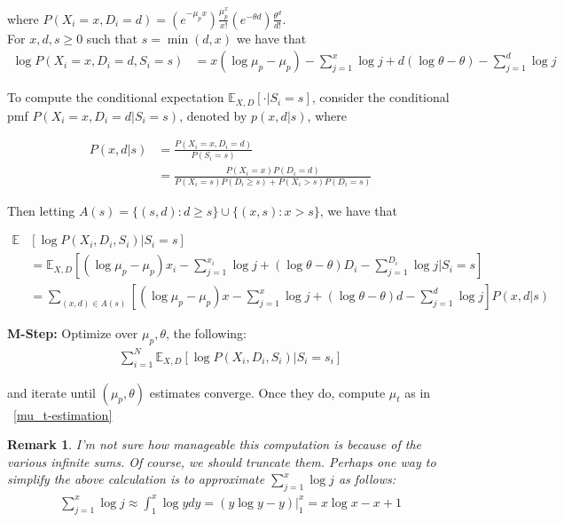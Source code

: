 \documentclass[11pt, oneside]{article}   	%
\theoremstyle{ModifiedStyle}
\newtheorem{remark}{Remark}
\begin{document}
where $P(X_i=x,D_i=d) = (e^{-\mu_px})\frac{\mu_p^x}{x!} (e^{-\theta d}) \frac{\theta^d}{d!}$.\\
For $x,d,s \geq 0$ such that $s=\min(d,x)$ we have that
\begin{align*}
	\log P(X_i=x,D_i=d,S_i=s) &= x(\log \mu_p - \mu_p) - \sum_{j=1}^x \log j + d(\log\theta - \theta) - \sum_{j=1}^d \log j
\end{align*}

To compute the conditional expectation $\mathbb{E}_{X,D}[\cdot | S_i =s]$, consider
the conditional pmf $P(X_i=x,D_i=d | S_i = s)$, denoted by $p(x,d|s)$, where

\begin{align*}
	P(x,d|s) &= \frac{P(X_i = x, D_i = d)}{P(S_i = s)} \\
	&= \frac{P(X_i = x) P(D_i = d)}{P(X_i = s) P(D_i \geq s) + P(X_i > s) P(D_i = s)}
\end{align*}

Then letting $A(s) = \{(s,d) : d \geq s \} \cup \{(x,s):x>s\}$, we have that

\begin{align*}
	\mathbb{E}&[\log P(X_i,D_i,S_i) | S_i =s] \\
	 &= \mathbb{E}_{X,D}[(\log \mu_p -\mu_p)x_i - \sum_{j=1}^{x_i} \log j + (\log \theta - \theta)D_i - \sum_{j=1}^{D_i} \log j | S_i = s]\\
	 &= \sum_{(x,d)\in A(s)} [(\log \mu_p - \mu_p)x - \sum_{j=1}^x \log j + (\log \theta - \theta)d - \sum_{j=1}^d \log j]P(x,d|s)
\end{align*}

\noindent \textbf{M-Step:} Optimize over $\mu_p, \theta$, the following:
\begin{align*}
	\sum_{i=1}^N \mathbb{E}_{X,D}[\log P(X_i,D_i,S_i)|S_i = s_i]
\end{align*}

and iterate until $(\mu_p,\theta)$ estimates converge. Once they do, compute $\mu_t$ as in ~\ref{mu_t-estimation}

\begin{remark}
	I'm not sure how manageable this computation is because of the various infinite sums. Of course, we should truncate them. Perhaps one way to simplify the above calculation is to approximate $\sum_{j=1}^x\log j$ as follows:
	\begin{align*}
		\sum_{j=1}^x \log j \approx \int_1^x \log y dy = (y\log y - y) |_1^x = x\log x - x + 1
	\end{align*}
\end{remark}
\end{document}
